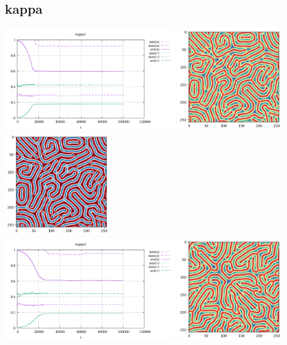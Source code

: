 \subsection*{kappa}
\begin{center}
\includegraphics[height=4.5cm]{python_codes/fieldstone_171/results/kappa1_stats}
\includegraphics[height=4.5cm]{python_codes/fieldstone_171/results/kappa1_solution_final_u.png}
\includegraphics[height=4.5cm]{python_codes/fieldstone_171/results/kappa1_solution_final_v.png}\\
\includegraphics[height=4.5cm]{python_codes/fieldstone_171/results/kappa2_stats}
\includegraphics[height=4.5cm]{python_codes/fieldstone_171/results/kappa2_solution_final_u.png}

\end{center}
